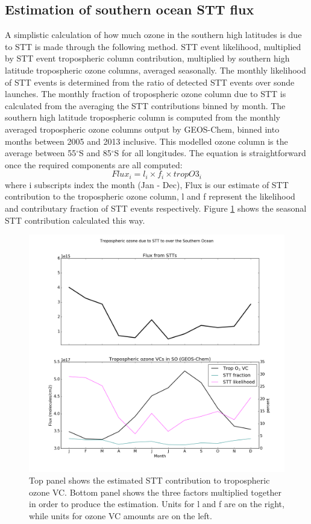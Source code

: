   \subsection{Estimation of southern ocean STT flux}
    A simplistic calculation of how much ozone in the southern high latitudes is due to STT is made through the following method.
    STT event likelihood, multiplied by STT event tropospheric column contribution, multiplied by southern high latitude tropospheric ozone columns, averaged seasonally.
    The monthly likelihood of STT events is determined from the ratio of detected STT events over sonde launches.
    The monthly fraction of tropospheric ozone column due to STT is calculated from the averaging the STT contributions binned by month.
    The southern high latitude tropospheric column is computed from the monthly averaged tropospheric ozone columns output by GEOS-Chem, binned into months between 2005 and 2013 inclusive.
    This modelled ozone column is the average between 55$^{\circ}$S and 85$^{\circ}$S for all longitudes.
    The equation is straightforward once the required components are all computed:
    \begin{equation*}
      Flux_i = l_i \times f_i \times tropO3_i
    \end{equation*}
    where i subscripts index the month (Jan - Dec), Flux is our estimate of STT contribution to the tropospheric ozone column, l and f represent the likelihood and contributary fraction of STT events respectively.
    Figure \ref{ch_o3:fig:SOExtrapolation} shows the seasonal STT contribution calculated this way.
    
    \begin{figure}[!htbp]
      \includegraphics[width=\textwidth]{Figures/Ozone/SO_extrapolation.png}
      \caption{Top panel shows the estimated STT contribution to tropospheric ozone VC. Bottom panel shows the three factors multiplied together in order to produce the estimation. Units for l and f are on the right, while units for ozone VC amounts are on the left.}
      \label{ch_o3:fig:SOExtrapolation}
    \end{figure}
    
    